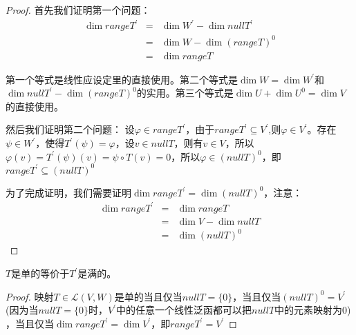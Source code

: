 \documentclass[10pt,a4paper,UTF8]{article}
\begin{document}
\begin{proof}
首先我们证明第一个问题：
\begin{eqnarray}
\label{eq:6}
\dim rangeT^{'}&=& \dim  W^{'} - \dim nullT^{'} \\
&=& \dim W - \dim (rangeT)^{0} \\
&=& \dim rangeT
\end{eqnarray}

第一个等式是线性应设定里的直接使用。第二个等式是\(\dim W = \dim W^{'}\)和\(\dim nullT^{'} - \dim (rangeT)^{0}\)的实用。第三个等式是\(\dim U + \dim U^{0} = \dim V\)的直接使用。

然后我们证明第二个问题：
设\(\varphi\in rangeT^{'}\)，由于\(rangeT^{'}\subseteq V^{'}\),则\(\varphi\in V^{'}\)。存在\(\psi\in W^{'}\)，使得\(T^{'}(\psi) = \varphi\)，设\(v\in nullT\)，则有\(v \in V\)，所以\(\varphi(v) = T^{'}(\psi)(v) = \psi\circ T(v) = 0\)，所以\(\varphi \in (nullT)^{0}\)，即\(rangeT^{'} \subseteq (nullT)^{0}\)

为了完成证明，我们需要证明\(\dim rangeT^{'} = \dim (nullT)^{0}\)，注意：
\begin{eqnarray}
\label{eq:7}
\dim rangeT^{'}&=&\dim rangeT \\
&=& \dim V - \dim nullT \\
&=& \dim (nullT)^{0}
\end{eqnarray}
\end{proof}

\begin{theorem}
\(T\)是单的等价于\(T^{'}\)是满的。
\end{theorem}

\begin{proof}
映射\(T\in \mathcal{L}(V,W)\)是单的当且仅当\(nullT = \{0\}\)，当且仅当\((nullT)^{0} = V^{'}\) (因为当\(nullT = \{0\}\)时，\(V^{'}\)中的任意一个线性泛函都可以把\(nullT\)中的元素映射为0) ，当且仅当\(\dim rangeT^{'} =\dim V^{'}\)，即\(rangeT^{'} = V^{'}\)
\end{proof}
\end{document}
